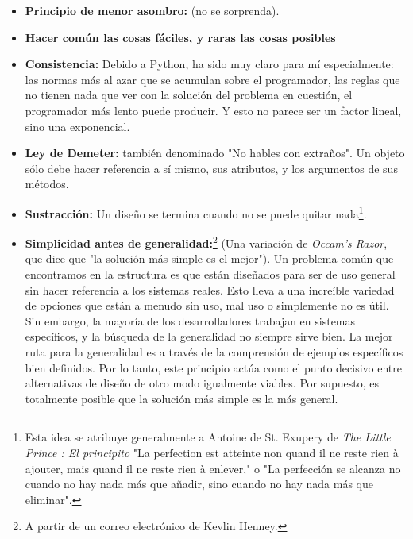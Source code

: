 \begin{itemize} %
    \item \textbf{Principio de menor asombro:}    (no se sorprenda).
    
    \item \textbf{Hacer común las cosas fáciles, y raras las cosas posibles}
    
    \item \textbf{Consistencia:} Debido a Python, ha sido muy claro para mí especialmente: las normas más al azar que se acumulan sobre el programador, las reglas que no tienen nada que ver con la solución del problema en cuestión, el programador más lento puede producir. Y esto no parece ser un factor lineal, sino una exponencial.
    
    \item \textbf{Ley de Demeter:} también denominado "No hables con extraños". Un objeto sólo debe hacer referencia a sí mismo, sus atributos, y los argumentos de sus métodos.
    
    \item \textbf{Sustracción:} Un diseño se termina cuando no se puede quitar nada\footnote{Esta idea se atribuye generalmente a Antoine de St. Exupery de \textit{The Little Prince : El principito}  "La perfection est atteinte non quand il ne reste rien à ajouter, mais quand il ne reste rien à enlever," o "La perfección se alcanza no cuando no hay nada más que añadir, sino cuando no hay nada más que eliminar".}.
    
    \item \textbf{Simplicidad antes de generalidad:}\footnote{A partir de un correo electrónico de Kevlin Henney.} (Una variación de \textit{Occam’s Razor}, que dice que "la solución más simple es el mejor"). Un problema común que encontramos en la estructura es que están diseñados para ser de uso general sin hacer referencia a los sistemas reales. Esto lleva a una increíble variedad de opciones que están a menudo sin uso, mal uso o simplemente no es útil. Sin embargo, la mayoría de los desarrolladores trabajan en sistemas específicos, y la búsqueda de la generalidad no siempre sirve bien. La mejor ruta para la generalidad es a través de la comprensión de ejemplos específicos bien definidos. Por lo tanto, este principio actúa como el punto decisivo entre alternativas de diseño de otro modo igualmente viables. Por supuesto, es totalmente posible que la solución más simple es la más general. %
    

\end{itemize}

